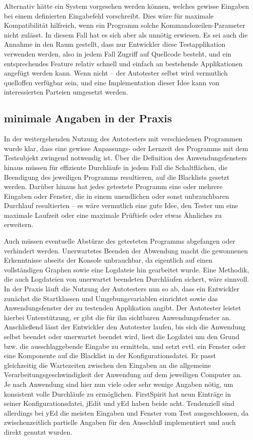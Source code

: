 Alternativ hätte ein System vorgesehen werden können, welches gewisse Eingaben
bei einem definierten Eingabefeld vorschreibt. Dies wäre für maximale Kompatibilität
hilfreich, wenn ein Programm solche Kommandozeilen-Parameter nicht zulässt.
In diesem Fall hat es sich aber als unnötig erwiesen. Es sei auch die
Annahme in den Raum gestellt, dass nur Entwickler diese Testapplikation
verwenden werden, also in jedem Fall Zugriff auf Quellcode besteht,
und ein entsprechendes Feature relativ schnell und einfach an bestehende
Applikationen angefügt werden kann. Wenn nicht -- der Autotester selbst
wird vermutlich quelloffen verfügbar sein, und eine Implementation
dieser Idee kann von interessierten Parteien umgesetzt werden.


\subsection{\glqq{}minimale\grqq{} Angaben in der Praxis}

In der weitergehenden Nutzung des Autotesters mit verschiedenen
Programmen wurde klar, dass eine gewisse Anpassungs- oder
Lernzeit des Programms mit dem Testsubjekt zwingend notwendig ist.
Über die Definition des Anwendungsfensters hinaus müssen für
effiziente Durchläufe in jedem Fall die Schaltflächen, die Beendigung
des jeweiligen Programms resultieren, auf die Blacklists gesetzt
werden. Darüber hinaus hat jedes getestete Programm eine oder
mehrere Eingaben oder Fenster, die in einem unendlichen oder
sonst unbrauchbaren Durchlauf resultierten -- es wäre vermutlich
eine gute Idee, den Tester um eine maximale Laufzeit oder
eine maximale Prüftiefe oder etwas Ähnliches zu erweitern.

Auch müssen eventuelle Abstürze des getesteten Programms
abgefangen oder verhindert werden. Unerwartetes Beenden
der Abwendung macht die gewonnenen Erkenntnisse abseits
der Konsole unbrauchbar, da eigentlich auf einen
vollständigen Graphen sowie eine Logdateie hin gearbeitet wurde.
Eine Methodik, die auch Logdateien von unerwartet beendeten
Durchläufen sichert, wäre sinnvoll. In der Praxis läuft
die Nutzung der Autotesters nun so ab, dass ein Entwickler
zunächst die Startklassen und Umgebungsvariablen einrichtet
sowie das Anwendungsfenster der zu testenden Applikation
angibt. Der Autotester leistet hierbei Unterstützung, er
gibt die für ihn sichtbaren Anwendungsfenster an. Anschließend
lässt der Entwickler den Autotester laufen, bis sich die Anwendung
selbst beendet oder unerwartet beendet wird, liest die Logdatei
um den Grund bzw. die ausschlaggebende Eingabe zu ermitteln,
und setzt evtl. ein Fenster oder eine Komponente auf die
Blacklist in der Konfigurationsdatei. Er passt gleichzeitig
die Wartezeiten zwischen den Eingaben an die allgemeine
Verarbeitungsgeschwindigkeit der Anwendung auf dem jeweiligen
Computer an. Je nach Anwendung sind hier nun viele oder
sehr wenige Angaben nötig, um konsistent volle Durchläufe
zu ermöglichen. FirstSpirit hat neun Einträge
in seiner Konfigurationsdatei, jEdit und yEd haben beide
acht. Tendenziell sind allerdings bei yEd die meisten Eingaben
und Fenster vom Test ausgeschlossen, da zwischenzeitlich
partielle Angaben für den Ausschluß implementiert und auch
direkt genutzt wurden.
